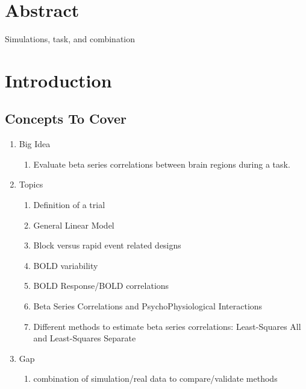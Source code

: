 \documentclass[10pt,letterpaper]{article}
\begin{document}
\section*{Abstract}
Simulations, task, and combination


\linenumbers

\section*{Introduction}
\subsection{Concepts To Cover}
\begin{enumerate}
	\item Big Idea
  \begin{enumerate}
    \item Evaluate beta series correlations between brain regions during a task.
  \end{enumerate}
	\item Topics
	\begin{enumerate}
    \item Definition of a trial
    \item General Linear Model
    \item Block versus rapid event related designs
    \item BOLD variability
    \item BOLD Response/BOLD correlations
    \item Beta Series Correlations and PsychoPhysiological Interactions
    \item Different methods to estimate beta series correlations: Least-Squares All and Least-Squares Separate
  \end{enumerate}
	\item Gap
  \begin{enumerate}
    \item combination of simulation/real data to compare/validate methods
  \end{enumerate}
\end{enumerate}
\end{document}

